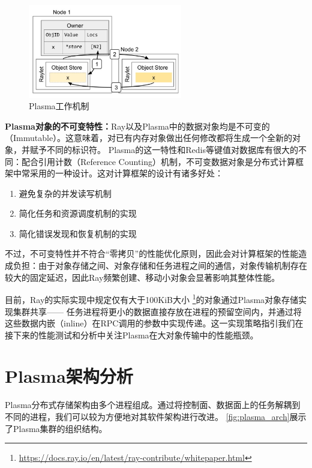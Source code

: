 \begin{figure}[h] 
    \centering
    \includegraphics[width=0.6\textwidth]{image/chap02/object_fetch.png}
    \caption{Plasma工作机制}
    \label{fig:object_fetch}
\end{figure}

\textbf{Plasma对象的不可变特性：}Ray以及Plasma中的数据对象均是不可变的（Immutable）。这意味着，对已有内存对象做出任何修改都将生成一个全新的对象，并赋予不同的标识符。
Plasma的这一特性和Redis等键值对数据库有很大的不同：配合引用计数（Reference Counting）机制，不可变数据对象是分布式计算框架中常采用的一种设计。这对计算框架的设计有诸多好处：

\begin{enumerate}
    \item 避免复杂的并发读写机制
    \item 简化任务和资源调度机制的实现
    \item 简化错误发现和恢复机制的实现
\end{enumerate}

不过，不可变特性并不符合“零拷贝”的性能优化原则，因此会对计算框架的性能造成负担：由于对象存储之间、对象存储和任务进程之间的通信，对象传输机制存在较大的固定延迟，因此Ray频繁创建、移动小对象会显著影响其整体性能。

目前，Ray的实际实现中规定仅有大于100KiB大小
\footnote{\url{https://docs.ray.io/en/latest/ray-contribute/whitepaper.html}}的对象通过Plasma对象存储实现集群共享——
任务进程将更小的数据直接存放在进程的预留空间内，并通过将这些数据内嵌（inline）在RPC调用的参数中实现传递。这一实现策略指引我们在接下来的性能测试和分析中关注Plasma在大对象传输中的性能瓶颈。

\section{Plasma架构分析}

Plasma分布式存储架构由多个进程组成。通过将控制面、数据面上的任务解耦到不同的进程，我们可以较为方便地对其软件架构进行改进。
\autoref{fig:plasma_arch}展示了Plasma集群的组织结构。

